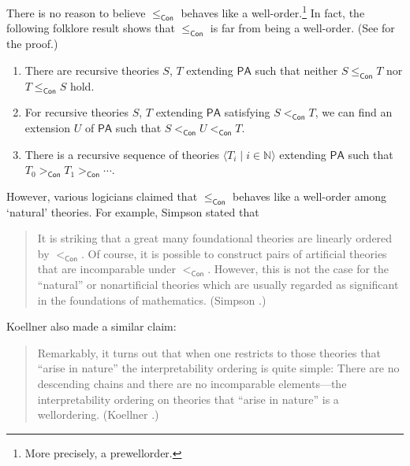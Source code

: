 \documentclass{mhkr}
\newcommand{\added}[1]{#1}
\newcommand{\lag}{\langle}
\newcommand{\rag}{\rangle}
\newcommand{\bbN}{\mathbb{N}}
\newcommand{\Con}{\mathsf{Con}}
\newcommand{\PA}{\mathsf{PA}}
\begin{document}
There is no reason to believe $\le_\Con$ behaves like a well-order.\footnote{More precisely, a prewellorder.} \added{In fact, the following folklore result shows that $\le_\Con$ is far from being a well-order. (See \cite{Hamkins2022Nonlinearity} for the proof.)}
\begin{theorem} \pushQED{\qed}
    \begin{enumerate}
        \item There are \added{recursive} theories $S$, $T$ extending $\PA$ such that neither $S\le_\Con T$ nor $T\le_\Con S$ hold.
        \item For \added{recursive} theories $S$, $T$ extending $\PA$ satisfying $S<_\Con T$, we can find an extension $U$ of $\PA$ such that $S <_\Con U <_\Con T$.
        \item There is \added{a recursive sequence of theories} $\lag T_i\mid i\in\bbN\rag $ extending $\PA$ such that $T_0 >_\Con T_1 >_\Con \cdots$. \qedhere 
    \end{enumerate}
\end{theorem}

However, various logicians claimed that $\le_\Con$ behaves like a well-order among `natural' theories. For example, Simpson stated that
\begin{quote}
    It is striking that a great many foundational theories are linearly ordered by $<_\Con$. Of course, it is possible to construct pairs of artificial theories that are incomparable under $<_\Con$. However, this is not the case for the ``natural'' or nonartificial theories which are usually regarded as significant in the foundations of mathematics. (Simpson \cite[p111]{Simpson2010GodelHierarchy}.)
\end{quote}

Koellner also made a similar claim:
\begin{quote}
    Remarkably, it turns out that when one restricts to those theories that ``arise in nature'' the interpretability ordering is quite simple: There are no descending chains and there are no incomparable elements—the interpretability ordering on theories that ``arise in nature'' is a wellordering. (Koellner \cite{Koellner2011IndependenceLC}.)
\end{quote}
\end{document}
